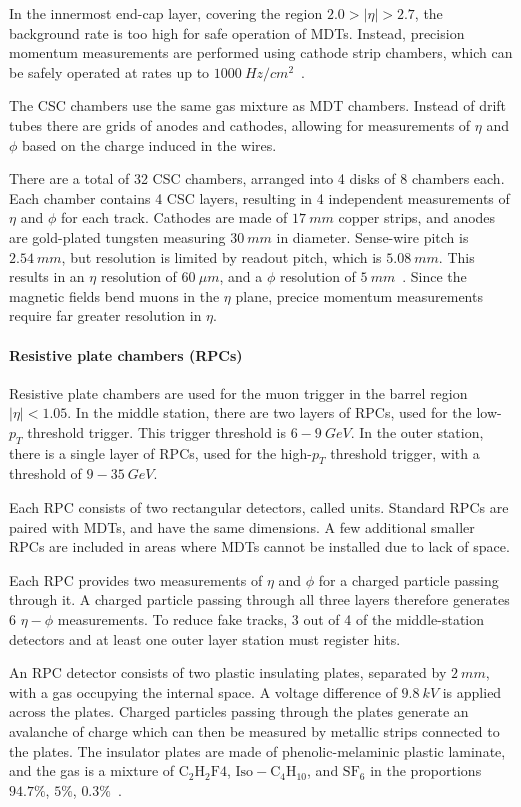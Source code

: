 In the innermost end-cap layer, covering the region $2.0 > |\eta| > 2.7$,
the background rate is too high for safe operation of MDTs.
Instead, precision momentum measurements are performed using cathode strip chambers,
which can be safely operated at rates up to $1000~Hz/cm^2$~\cite{atlas-detector-2008}.

The CSC chambers use the same gas mixture as MDT chambers.
Instead of drift tubes there are grids of anodes and cathodes, allowing for measurements of $\eta$ and $\phi$ based on
the charge induced in the wires.

There are a total of 32 CSC chambers, arranged into 4 disks of 8 chambers each.
Each chamber contains 4 CSC layers, resulting in 4 independent measurements of $\eta$ and $\phi$ for each track.
Cathodes are made of $17~mm$ copper strips, and anodes are gold-plated tungsten measuring $30~mm$ in diameter.
Sense-wire pitch is $2.54~mm$, but resolution is limited by readout pitch, which is $5.08~mm$.
This results in an $\eta$ resolution of $60~\mu m$, and a $\phi$ resolution of $5~mm$~\cite{muon-2003}.
Since the magnetic fields bend muons in the $\eta$ plane, precice momentum measurements require far greater resolution in $\eta$.

\paragraph{Resistive plate chambers (RPCs)}

Resistive plate chambers are used for the muon trigger in the barrel region $|\eta| < 1.05$.
In the middle station, there are two layers of RPCs, used for the low-$p_T$ threshold trigger.
This trigger threshold is $6-9~GeV$.
In the outer station, there is a single layer of RPCs, used for the high-$p_T$ threshold trigger,
with a threshold of $9-35~GeV$.

Each RPC consists of two rectangular detectors, called units.
Standard RPCs are paired with MDTs, and have the same dimensions.
A few additional smaller RPCs are included in areas where MDTs cannot be installed due to lack of space.

Each RPC provides two measurements of $\eta$ and $\phi$ for a charged particle passing through it.
A charged particle passing through all three layers therefore generates 6 $\eta-\phi$ measurements.
To reduce fake tracks, 3 out of 4 of the middle-station detectors and at least one outer layer station must register hits.

An RPC detector consists of two plastic insulating plates, separated by $2~mm$, with a gas occupying the internal space.
A voltage difference of $9.8~kV$ is applied across the plates.
Charged particles passing through the plates generate an avalanche of charge which can then be measured by metallic strips connected to the plates.
The insulator plates are made of phenolic-melaminic plastic laminate,
and the gas is a mixture of $\mathrm{C_2 H_2 F4}$, $\mathrm{Iso-C_4 H_{10}}$, and $\mathrm{SF_6}$
in the proportions $94.7\%$, $5\%$, $0.3\%$~\cite{atlas-detector-2008}.

